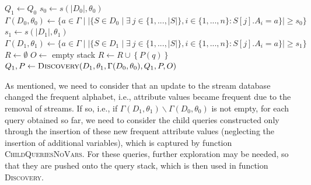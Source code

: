 \begin{algorithm}[t]
    \small
    \caption{\textsc{UpdateMinus}}
    \label{alg_spec}
    \BlankLine
    $\mathit{Q_1 \leftarrow Q_0}$\;
    $s_0 \gets s(|D_0|,\theta_0)$\;
    $\Gamma(D_0,\theta_0) \gets \{a \in
    \Gamma \mid |\{S \in D_0 \mid \exists \
    j\in\{1,...,|S|\},
    i\in\{1,...,n\}: S[j].A_i = a\}|\geq s_0\}$\;
    $s_1 \gets s(|D_1|,\theta_1)$\;
    $\Gamma(D_1,\theta_1) \gets \{a \in
    \Gamma \mid |\{S \in D_1 \mid \exists \
    j\in\{1,...,|S|\},
    i\in\{1,...,n\}: S[j].A_i = a\}| \geq s_1\}$\;
    $\mathit{R \leftarrow \emptyset}$\;
    ${O \leftarrow}$ empty stack\;
    \lForEach{$q\in Q_1$}
        {$R \leftarrow R \cup \left\{P(q)\right\} $}
    $ Q_1,P \leftarrow \textsc{Discovery}(D_1,\theta_1,
    \Gamma({D_0},\theta_0), Q_1, P, O)$\;

    {}
    \end{algorithm}

As mentioned, we need to consider that an update to the stream
database changed the frequent alphabet, i.e., attribute values became
frequent due to the removal of streams. If so, i.e., if
$\Gamma({D_1},\theta_1)\backslash
\Gamma({D_0},\theta_0)$ is not empty, for each query obtained so far, we
need to consider the child queries constructed
only through the insertion of these new frequent attribute values
(neglecting the insertion of additional variables), which is captured by
function \textsc{ChildQueriesNoVars}. For these queries, further exploration
may be needed, so that they are pushed onto the query stack, which is then
used in function \textsc{Discovery}.
